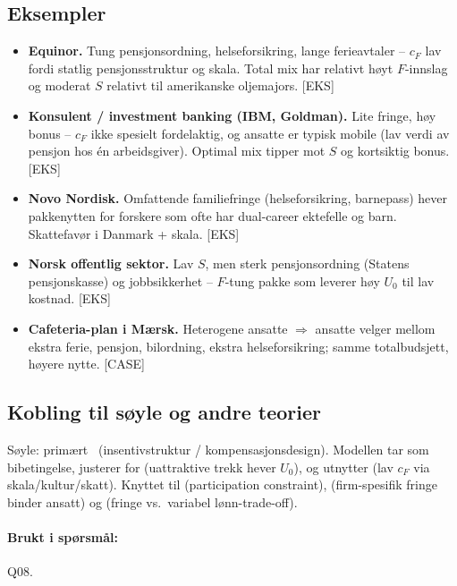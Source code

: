 \subsection*{Eksempler}
\begin{itemize}
\item \textbf{Equinor.} Tung pensjonsordning, helseforsikring, lange ferieavtaler -- $c_F$ lav fordi statlig pensjonsstruktur og skala. Total mix har relativt høyt $F$-innslag og moderat $S$ relativt til amerikanske oljemajors. [EKS]
\item \textbf{Konsulent / investment banking (IBM, Goldman).} Lite fringe, høy bonus -- $c_F$ ikke spesielt fordelaktig, og ansatte er typisk mobile (lav verdi av pensjon hos én arbeidsgiver). Optimal mix tipper mot $S$ og kortsiktig bonus. [EKS]
\item \textbf{Novo Nordisk.} Omfattende familiefringe (helseforsikring, barnepass) hever pakkenytten for forskere som ofte har dual-career ektefelle og barn. Skattefavør i Danmark + skala. [EKS]
\item \textbf{Norsk offentlig sektor.} Lav $S$, men sterk pensjonsordning (Statens pensjonskasse) og jobbsikkerhet -- $F$-tung pakke som leverer høy $U_0$ til lav kostnad. [EKS]
\item \textbf{Cafeteria-plan i Mærsk.} Heterogene ansatte $\Rightarrow$ ansatte velger mellom ekstra ferie, pensjon, bilordning, ekstra helseforsikring; samme totalbudsjett, høyere nytte. [CASE]
\end{itemize}

\subsection*{Kobling til søyle og andre teorier}
Søyle: primært \SThree\ (insentivstruktur / kompensasjonsdesign). Modellen tar  som bibetingelse, justerer for  (uattraktive trekk hever $U_0$), og utnytter  (lav $c_F$ via skala/kultur/skatt). Knyttet til  (participation constraint),  (firm-spesifik fringe binder ansatt) og  (fringe vs.\ variabel lønn-trade-off).

\paragraph{Brukt i spørsmål:} Q08.
